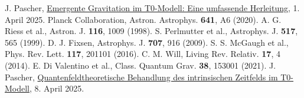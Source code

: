 \documentclass[12pt,a4paper]{article}
\begin{document}
\begin{thebibliography}{99}
		 J. Pascher, \href{https://github.com/jpascher/T0-Time-Mass-Duality/tree/main/2/pdf/Deutsch/EmergentGravT0.pdf}{Emergente Gravitation im T0-Modell: Eine umfassende Herleitung}, 1. April 2025.
		 Planck Collaboration, Astron. Astrophys. \textbf{641}, A6 (2020).
		 A. G. Riess et al., Astron. J. \textbf{116}, 1009 (1998).
		 S. Perlmutter et al., Astrophys. J. \textbf{517}, 565 (1999).
		 D. J. Fixsen, Astrophys. J. \textbf{707}, 916 (2009).
		 S. S. McGaugh et al., Phys. Rev. Lett. \textbf{117}, 201101 (2016).
		 C. M. Will, Living Rev. Relativ. \textbf{17}, 4 (2014).
		 E. Di Valentino et al., Class. Quantum Grav. \textbf{38}, 153001 (2021).
		 J. Pascher, \href{https://github.com/jpascher/T0-Time-Mass-Duality/tree/main/2/pdf/Deutsch/QFTIntrinsischesZeitT0.pdf}{Quantenfeldtheoretische Behandlung des intrinsischen Zeitfelds im T0-Modell}, 8. April 2025.
	\end{thebibliography}
	
\end{document}
